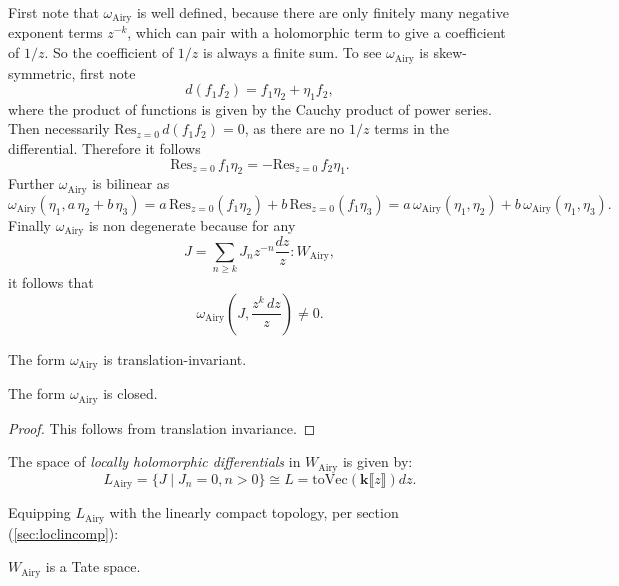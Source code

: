         First note that \( \omega_{\mathrm{Airy}}\) is well defined, because there are only finitely many negative exponent terms \(z^{-k}\), which can pair with a holomorphic term to give a coefficient of \(1/z\). So the coefficient of \(1/z\) is always a finite sum. To see \( \omega_{\mathrm{Airy}}\) is skew-symmetric, first note \[ d(f_1 f_2)= f_1 \eta_2 + \eta_1 f_2, \] where the product of functions is given by the Cauchy product of power series. Then necessarily \(\mathrm{Res}_{z=0}\, d(f_1 f_2) = 0\), as there are no \(1/z\) terms in the differential. Therefore it follows 
        \[ \mathrm{Res}_{z=0}\,f_1 \eta_2 = - \mathrm{Res}_{z=0}\,f_2 \eta_1.\] 
        Further \( \omega_{\mathrm{Airy}}\) is bilinear as  \[ \omega_{\mathrm{Airy}}( \eta_1,a \, \eta_2 + b\, \eta_3 ) =   a\, \mathrm{Res}_{z=0}(f_1 \eta_2) + b\, \mathrm{Res}_{z=0}(f_1 \eta_3) = a \,\omega_{\mathrm{Airy}}( \eta_1, \eta_2 ) +  b\, \omega_{\mathrm{Airy}}( \eta_1, \eta_3). \]
        Finally \(\omega_{\mathrm{Airy}} \) is non degenerate because for any \[ J=\sum_{n\geq k} J_nz^{-n}\frac{dz}{z}  : W_{\mathrm{Airy}},\] 
        it follows that
        \[ \omega_{\mathrm{Airy}} \left( J, \frac{ z^k \, dz}{z} \right) \neq 0. \]
        

        \begin{prop} The form \(\omega_{\mathrm{Airy}}\) is translation-invariant. 
        \end{prop}
        
        
        
        \begin{prop} The form \(\omega_{\mathrm{Airy}}\) is closed. 
        \end{prop}
        \begin{proof} 
         This follows from translation invariance.
         \end{proof}
         
        \begin{defn} The space of \emph{locally holomorphic differentials} in \(W_{\mathrm{Airy}}\) is given by: 
        \[ L_{\text{Airy}} =\{J\mid J_n=0,n>0\} \cong L = \mathrm{toVec} (\mathbf{k}\lBrack z \rBrack) dz. \]
        \end{defn}
        
        Equipping \(L_{\text{Airy}}\) with the linearly compact topology, per section (\ref{sec:loclincomp}):
    
        \begin{prop}
        \( W_{\mathrm{Airy}}\) is a Tate space.
        \end{prop}
        
